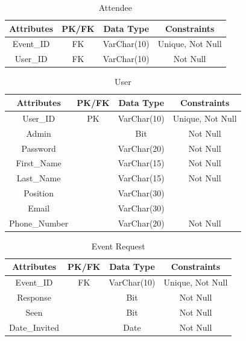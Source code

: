 \documentclass[a4paper]{article}
\begin{document}
\begin{table}[ht]
    \caption{Attendee}
    \centering
    \begin{tabular}{|c|c|c|c|}
        \hline
        Attributes & PK/FK & Data Type & Constraints  \\
        \hline
        Event\_ID & FK & VarChar(10) & Unique, Not Null \\
        \hline
        User\_ID & FK & VarChar(10) & Not Null \\
        \hline
    \end{tabular}
    \label{tab:attendee}
\end{table}

\begin{table}[ht]
    \caption{User}
    \centering
    \begin{tabular}{|c|c|c|c|}
        \hline
        Attributes & PK/FK & Data Type & Constraints  \\
        \hline
        User\_ID & PK & VarChar(10) & Unique, Not Null \\
        \hline
        Admin & & Bit & Not Null \\
        \hline
        Password & & VarChar(20) & Not Null \\
        \hline
        First\_Name & & VarChar(15) & Not Null \\
        \hline
        Last\_Name & & VarChar(15) & Not Null \\
        \hline
        Position & & VarChar(30) & \\
        \hline
        Email & & VarChar(30) & \\
        \hline
        Phone\_Number & & VarChar(20) & Not Null \\
        \hline
    \end{tabular}
    \label{tab:user}
\end{table}

\begin{table}[!ht]
    \caption{Event Request}
    \centering
    \begin{tabular}{|c|c|c|c|}
        \hline
        Attributes & PK/FK & Data Type & Constraints  \\
        \hline
        Event\_ID & FK & VarChar(10) & Unique, Not Null \\
        \hline
        Response & & Bit & Not Null \\
        \hline
        Seen & & Bit & Not Null \\
        \hline
        Date\_Invited & & Date & Not Null \\
        \hline
    \end{tabular}
    \label{tab:event_request}
\end{table}
\end{document}
